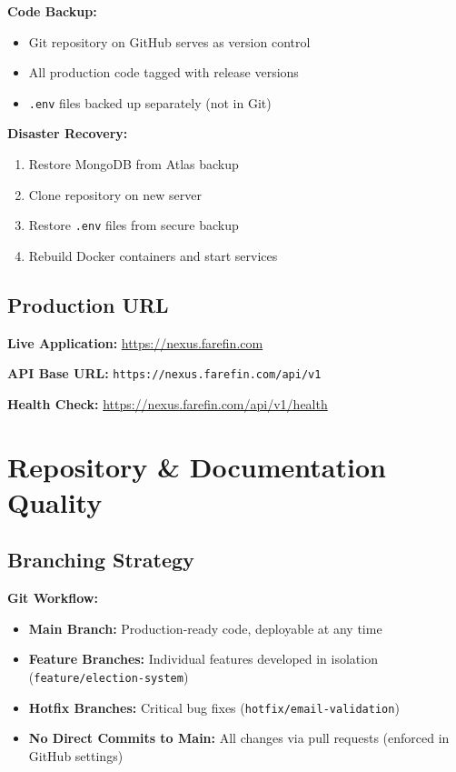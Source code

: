 \documentclass[12pt,a4paper]{article}
\begin{document}
\textbf{Code Backup:}
\begin{itemize}[noitemsep]
  \item Git repository on GitHub serves as version control
  \item All production code tagged with release versions
  \item \texttt{.env} files backed up separately (not in Git)
\end{itemize}

\textbf{Disaster Recovery:}
\begin{enumerate}[noitemsep]
  \item Restore MongoDB from Atlas backup
  \item Clone repository on new server
  \item Restore \texttt{.env} files from secure backup
  \item Rebuild Docker containers and start services
\end{enumerate}

\subsection{Production URL}

\textbf{Live Application:} \url{https://nexus.farefin.com}

\textbf{API Base URL:} \texttt{https://nexus.farefin.com/api/v1}

\textbf{Health Check:} \url{https://nexus.farefin.com/api/v1/health}

\section{Repository \& Documentation Quality}

\subsection{Branching Strategy}

\textbf{Git Workflow:}
\begin{itemize}[noitemsep]
  \item \textbf{Main Branch:} Production-ready code, deployable at any time
  \item \textbf{Feature Branches:} Individual features developed in isolation (\texttt{feature/election-system})
  \item \textbf{Hotfix Branches:} Critical bug fixes (\texttt{hotfix/email-validation})
  \item \textbf{No Direct Commits to Main:} All changes via pull requests (enforced in GitHub settings)
\end{itemize}
\end{document}
